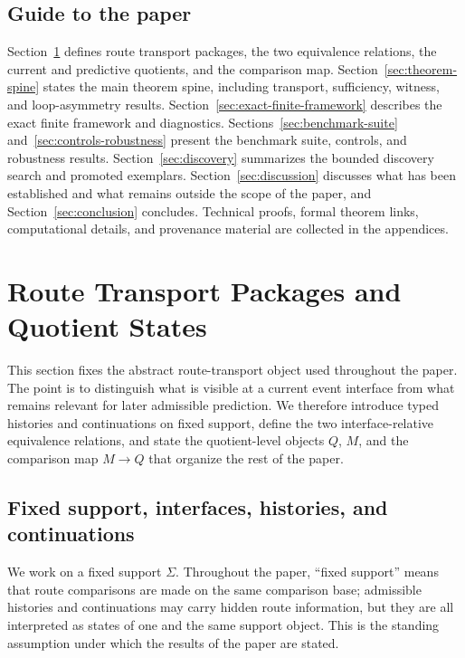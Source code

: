 \documentclass[11pt]{article}
\newcommand{\CurrentQ}{Q}
\newcommand{\PredictiveQ}{M}
\newcommand{\Support}{\Sigma}
\theoremstyle{definition}
\begin{document}
\subsection{Guide to the paper}\label{subsec:intro-guide}
Section~\ref{sec:route-transport-packages} defines route transport packages, the two equivalence relations, the current and predictive quotients, and the comparison map. Section~\ref{sec:theorem-spine} states the main theorem spine, including transport, sufficiency, witness, and loop-asymmetry results. Section~\ref{sec:exact-finite-framework} describes the exact finite framework and diagnostics. Sections~\ref{sec:benchmark-suite} and~\ref{sec:controls-robustness} present the benchmark suite, controls, and robustness results. Section~\ref{sec:discovery} summarizes the bounded discovery search and promoted exemplars. Section~\ref{sec:discussion} discusses what has been established and what remains outside the scope of the paper, and Section~\ref{sec:conclusion} concludes. Technical proofs, formal theorem links, computational details, and provenance material are collected in the appendices.

\section{Route Transport Packages and Quotient States}\label{sec:route-transport-packages}
This section fixes the abstract route-transport object used throughout the paper. The point is to distinguish what is visible at a current event interface from what remains relevant for later admissible prediction. We therefore introduce typed histories and continuations on fixed support, define the two interface-relative equivalence relations, and state the quotient-level objects $\CurrentQ$, $\PredictiveQ$, and the comparison map $\PredictiveQ \to \CurrentQ$ that organize the rest of the paper.

\subsection{Fixed support, interfaces, histories, and continuations}\label{subsec:rtp-fixed-support}
We work on a fixed support $\Support$. Throughout the paper, ``fixed support'' means that route comparisons are made on the same comparison base; admissible histories and continuations may carry hidden route information, but they are all interpreted as states of one and the same support object. This is the standing assumption under which the results of the paper are stated.
\end{document}
